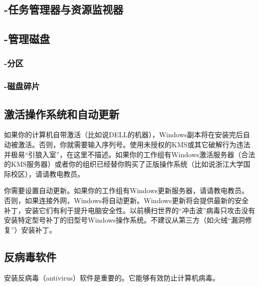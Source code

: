 \subsection{-任务管理器与资源监视器}
\subsection{-管理磁盘}
\subsubsection{-分区}
\subsubsection{-磁盘碎片}
\subsection{激活操作系统和自动更新}
如果你的计算机自带激活（比如说DELL的机器），Windows副本将在安装完后自动被激活。否则，你就需要输入序列号。使用未授权的KMS或其它破解行为违法并极易“引狼入室”，在这里不描述。如果你的工作组有Windows激活服务器（合法的KMS服务器）或者你的组织已经替你购买了正版操作系统（比如说浙江大学国际校区），请请教电教员。\par
你需要设置自动更新。如果你的工作组有Windows更新服务器，请请教电教员。否则，如果连接外网，Windows将自动更新。Windows更新将会提供最新的安全补丁，安装它们有利于提升电脑安全性。以前横扫世界的“冲击波”病毒只攻击没有安装特定型号补丁的旧型号Windows操作系统。不建议从第三方（如火绒“漏洞修复”）安装补丁。
\subsection{反病毒软件}
安装反病毒（antivirus）软件是重要的。它能够有效防止计算机病毒。
